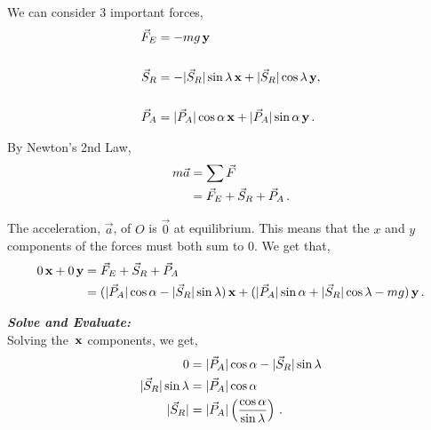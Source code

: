 \begin{subquestions}
\begin{subsubquestions}
	We can consider 3 important forces,
	\begin{align}
		\vec{F}_{E} & = -mg\,\mathbf{y} \\ \nonumber \\
		\vec{S}_{R} & = -|\vec{S}_{R}|\sin{\lambda}\,\mathbf{x} +|\vec{S}_{R}|\cos{\lambda}\,\mathbf{y} ,\\ \nonumber \\
		\vec{P}_{A} & = |\vec{P}_{A}|\cos{\alpha}\,\mathbf{x} + |\vec{P}_{A}|\sin{\alpha}\,\mathbf{y}  \,.
	\end{align}
	
	By Newton's 2nd Law,
	\begin{align}
		m\vec{a} & = \sum{\vec{F}} \nonumber \\
		& = \vec{F}_{E} + \vec{S}_{R} + \vec{P}_{A} \,.
	\end{align}
	
	The acceleration, $\vec{a}$, of $O$ is $\vec{0}$ at equilibrium. This means that the $x$ and $y$ components of the forces must both sum to 0. We get that,
	\begin{align}
		0\,\mathbf{x} + 0\,\mathbf{y} & = \vec{F}_{E} + \vec{S}_{R} + \vec{P}_{A} \nonumber \\
		& = (|\vec{P}_{A}|\cos{\alpha} - |\vec{S}_{R}|\sin{\lambda})\,\mathbf{x} + (|\vec{P}_{A}|\sin{\alpha} + |\vec{S}_{R}|\cos{\lambda} - mg)\,\mathbf{y} \,.		
	\end{align}
	
	
	
	\textbf{\textit{Solve and Evaluate:}} \\
	Solving the $\,\mathbf{x}$ components, we get,
	\begin{align}
		0 & = |\vec{P}_{A}|\cos{\alpha} - |\vec{S}_{R}|\sin{\lambda} \nonumber \\
		|\vec{S}_{R}|\sin{\lambda} & = |\vec{P}_{A}|\cos{\alpha} \nonumber \\
		|\vec{S}_{R}| & = |\vec{P}_{A}| \left(\frac{\cos{\alpha}}{\sin{\lambda}}\right) \,.
	\end{align}
	

\end{subsubquestions}
\end{subquestions}
